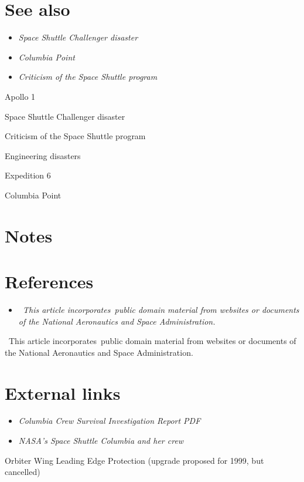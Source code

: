 \section{See also}\label{see-also}

\begin{itemize}
\item
  \emph{Space Shuttle Challenger disaster}
\item
  \emph{Columbia Point}
\item
  \emph{Criticism of the Space Shuttle program}
\end{itemize}

Apollo 1

Space Shuttle Challenger disaster

Criticism of the Space Shuttle program

Engineering disasters

Expedition 6

Columbia Point

\section{Notes}\label{notes}

\section{References}\label{references}

\begin{itemize}
\item
  \emph{~This article incorporates~public domain material from websites
  or documents of the National Aeronautics and Space Administration.}
\end{itemize}

~This article incorporates~public domain material from websites or
documents of the National Aeronautics and Space Administration.

\section{External links}\label{external-links}

\begin{itemize}
\item
  \emph{Columbia Crew Survival Investigation Report PDF}
\item
  \emph{NASA's Space Shuttle Columbia and her crew}
\end{itemize}

Orbiter Wing Leading Edge Protection (upgrade proposed for 1999, but
cancelled)


